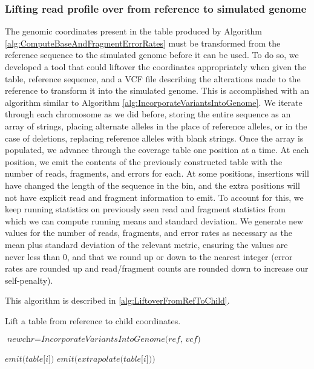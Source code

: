 \subsubsection{Lifting read profile over from reference to simulated genome}

The genomic coordinates present in the table produced by Algorithm \ref{alg:ComputeBaseAndFragmentErrorRates} must be transformed from the reference sequence to the simulated genome before it can be used.  To do so, we developed a tool that could liftover the coordinates appropriately when given the table, reference sequence, and a VCF file describing the alterations made to the reference to transform it into the simulated genome.  This is accomplished with an algorithm similar to Algorithm \ref{alg:IncorporateVariantsIntoGenome}.  We iterate through each chromosome as we did before, storing the entire sequence as an array of strings, placing alternate alleles in the place of reference alleles, or in the case of deletions, replacing reference alleles with blank strings.  Once the array is populated, we advance through the coverage table one position at a time.  At each position, we emit the contents of the previously constructed table with the number of reads, fragments, and errors for each.  At some positions, insertions will have changed the length of the sequence in the bin, and the extra positions will not have explicit read and fragment information to emit.  To account for this, we keep running statistics on previously seen read and fragment statistics from which we can compute running means and standard deviation.  We generate new values for the number of reads, fragments, and error rates as necessary as the mean plus standard deviation of the relevant metric, ensuring the values are never less than $0$, and that we round up or down to the nearest integer (error rates are rounded up and read/fragment counts are rounded down to increase our self-penalty).

This algorithm is described in \ref{alg:LiftoverFromRefToChild}.

\begin{algorithm}
\caption{Lift a table from reference to child coordinates.}
\label{alg:LiftoverFromRefToChild}
\begin{algorithmic}[1]
        \State $\textit{newchr} = \textit{IncorporateVariantsIntoGenome(ref, vcf)}$

            \State $\textit{emit(table[i])}$
                    \State $\textit{emit(extrapolate(table[i]))}$
                \EndFor
            \EndIf
        \EndFor
    \EndFor
\EndFunction
\end{algorithmic}
\end{algorithm}

